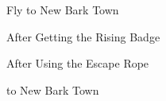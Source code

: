\begin{paracol}{2}
\switchcolumn*
\vspace{-0.8cm}
\begin{story}{Fly to New Bark Town}
	\varwb
	\varwe
\end{story}

\switchcolumn
\begin{menu}{After Getting the Rising Badge}
	\varwb
	\begin{packMenu}
		\item \superRepel
		\item \escapeRope
	\end{packMenu}
	\varwe
\end{menu}

\begin{menu}{After Using the Escape Rope}
	\varwb
	\begin{pokeMenu}
		\item {} \fly{} to New Bark Town 
	\end{pokeMenu}
	\varwe
\end{menu}

\end{paracol}
\vspace{3.5mm}